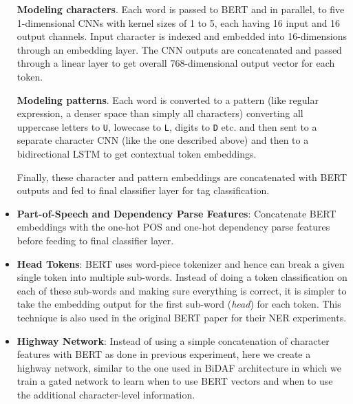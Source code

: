 \begin{itemize}
    \textbf{Modeling characters}. Each word is passed to BERT and in parallel, to five 1-dimensional CNNs with kernel sizes of 1 to 5, each having 16 input and 16 output channels. Input character is indexed and embedded into 16-dimensions through an embedding layer. The CNN outputs are concatenated and passed through a linear layer to get overall 768-dimensional output vector for each token.
    
    \textbf{Modeling patterns}. Each word is converted to a pattern (like regular expression, a denser space than simply all characters) converting all uppercase letters to \texttt{U}, lowecase to \texttt{L}, digits to \texttt{D} etc. and then sent to a separate character CNN (like the one described above) and then to a bidirectional LSTM to get contextual token embeddings.
    
    Finally, these character and pattern embeddings are concatenated with BERT outputs and fed to final classifier layer for tag classification.
    
    \item \textbf{Part-of-Speech and Dependency Parse Features}: Concatenate BERT embeddings with the one-hot POS and one-hot dependency parse features before feeding to final classifier layer.
    
    \item \textbf{Head Tokens}: BERT uses word-piece tokenizer and hence can break a given single token into multiple sub-words. Instead of doing a token classification on each of these sub-words and making sure everything is correct, it is simpler to take the embedding output for the first sub-word (\textit{head}) for each token. This technique is also used in the original BERT paper \cite{devlin2018bert} for their NER experiments. 
    
    \item \textbf{Highway Network}: Instead of using a simple concatenation of character features with BERT as done in previous experiment, here we create a highway network\cite{}, similar to the one used in BiDAF\cite{} architecture in which we train a gated network to learn when to use BERT vectors and when to use the additional character-level information.
\end{itemize}

